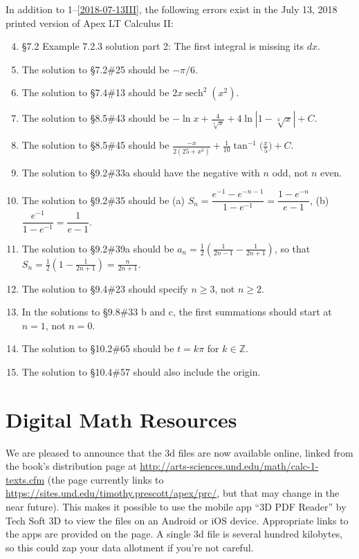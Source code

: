 \documentclass{amsart}
\newcommand{\ds}{\displaystyle}
\newcommand{\abs}[1]{\left\lvert#1\right\rvert}
\DeclareMathOperator{\sech}{sech}
\begin{document}
In addition to 1--\ref{2018-07-13III}, the following errors exist in the July 13, 2018 printed version of Apex LT Calculus II:
\begin{enumerate}\setcounter{enumi}{3}
\item \S7.2 Example 7.2.3 solution part 2: The first integral is missing its $dx$.
\item The solution to \S7.2\#25 should be $-\pi/6$.
\item The solution to \S7.4\#13 should be $2x\sech^2(x^2)$.
\item The solution to \S8.5\#43 should be $\ds-\ln x+\frac4{\sqrt[4]{x}}+4\ln\abs{1-\sqrt[4]{x}}+C$.
\item The solution to \S8.5\#45 should be $\ds\frac{-x}{2(25+x^2)}+\frac1{10}\tan^{-1}\bigl(\frac x5\bigr)+C$.
\item The solution to \S9.2\#33a should have the negative with $n$ odd, not $n$ even.
\item The solution to \S9.2\#35 should be (a) $S_n=\dfrac{e^{-1}-e^{-n-1}}{1-e^{-1}}=\dfrac{1-e^{-n}}{e-1}$, (b) $\dfrac{e^{-1}}{1-e^{-1}}=\dfrac1{e-1}$.
\item The solution to \S9.2\#39a should be $a_n = \frac12\left(\frac{1}{2n-1}-\frac{1}{2n+1}\right)$, so that $S_n=\frac12\left(1-\frac1{2n+1}\right) = \frac{n}{2n+1}$.
\item The solution to \S9.4\#23 should specify $n\ge3$, not $n\ge2$.
\item In the solutions to \S9.8\#33 b and c, the first summations should start at $n=1$, not $n=0$.
\item The solution to \S10.2\#65 should be $t=k\pi$ for $k\in\mathbb{Z}$.
\item The solution to \S10.4\#57 should also include the origin.
\label{2018-07-13II}
\end{enumerate}\vspace{.5in}

\section*{Digital Math Resources}

We are pleased to announce that the 3d files are now available online, linked from the book's distribution page at \url{http://arts-sciences.und.edu/math/calc-1-texts.cfm} (the page currently links to \url{https://sites.und.edu/timothy.prescott/apex/prc/}, but that may change in the near future).  This makes it possible to use the mobile app ``3D PDF Reader'' by Tech Soft 3D to view the files on an Android or iOS device.  Appropriate links to the apps are provided on the page.  A single 3d file is several hundred kilobytes, so this could zap your data allotment if you're not careful.
\end{document}
